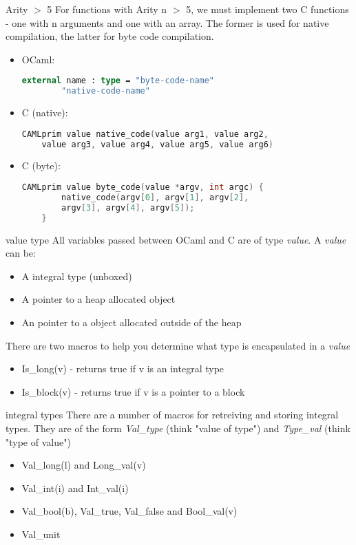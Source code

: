 \documentclass{beamer}
\begin{document}
\begin{frame}[fragile,shrink=15]{Arity $>$ 5}
For functions with Arity n $>$ 5, we must implement two C functions - one
with n arguments and one with an array.  The former is used for native compilation,
the latter for byte code compilation.
\begin{itemize}
    \item OCaml:
    \begin{lstlisting}[language=ML]
    external name : type = "byte-code-name"
        "native-code-name"
    \end{lstlisting}
    \item C (native):
    \begin{lstlisting}[language=C]
    CAMLprim value native_code(value arg1, value arg2,
    value arg3, value arg4, value arg5, value arg6)
    \end{lstlisting}
    \item C (byte):
    \begin{lstlisting}[language=C]
    CAMLprim value byte_code(value *argv, int argc) {
        native_code(argv[0], argv[1], argv[2],
        argv[3], argv[4], argv[5]);
    }
    \end{lstlisting}
\end{itemize}
\end{frame}

\begin{frame}{value type}
All variables passed between OCaml and C are of type \emph{value}.  A \emph{value} can be:
\begin{itemize} \item A integral type (unboxed) \item A pointer to a heap allocated object
    \item An pointer to a object allocated outside of the heap
\end{itemize}
There are two macros to help you determine what type is encapsulated in a \emph{value}
\begin{itemize}
    \item Is\_long(v) - returns true if v is an integral type
    \item Is\_block(v) - returns true if v is a pointer to a block
\end{itemize}
\end{frame}

\begin{frame}{integral types}
There are a number of macros for retreiving and storing integral types.
They are of the form \emph{Val\_type} (think "value of type") and \emph{Type\_val} (think "type of value")
\begin{itemize}
    \item Val\_long(l) and Long\_val(v)
    \item Val\_int(i) and Int\_val(i)
    \item Val\_bool(b), Val\_true, Val\_false and Bool\_val(v)
    \item Val\_unit
\end{itemize}
\end{frame}
\end{document}
